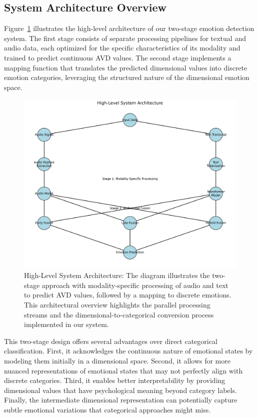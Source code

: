 \documentclass[12pt]{article}
\begin{document}
\subsection{System Architecture Overview}
Figure~\ref{fig:system_architecture} illustrates the high-level architecture of our two-stage emotion detection system. The first stage consists of separate processing pipelines for textual and audio data, each optimized for the specific characteristics of its modality and trained to predict continuous AVD values. The second stage implements a mapping function that translates the predicted dimensional values into discrete emotion categories, leveraging the structured nature of the dimensional emotion space.

\begin{figure}[h]
    \centering
    \includegraphics[width=0.9\linewidth]{Figures/system_architecture_fixed.png}
    \caption{High-Level System Architecture: The diagram illustrates the two-stage approach with modality-specific processing of audio and text to predict AVD values, followed by a mapping to discrete emotions. This architectural overview highlights the parallel processing streams and the dimensional-to-categorical conversion process implemented in our system.}
    \label{fig:system_architecture}
\end{figure}

This two-stage design offers several advantages over direct categorical classification. First, it acknowledges the continuous nature of emotional states by modeling them initially in a dimensional space. Second, it allows for more nuanced representations of emotional states that may not perfectly align with discrete categories. Third, it enables better interpretability by providing dimensional values that have psychological meaning beyond category labels. Finally, the intermediate dimensional representation can potentially capture subtle emotional variations that categorical approaches might miss.
\end{document}
